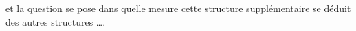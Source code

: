 et la question se pose dans quelle mesure cette structure supplémentaire se déduit des autres structures \ldots.

 
